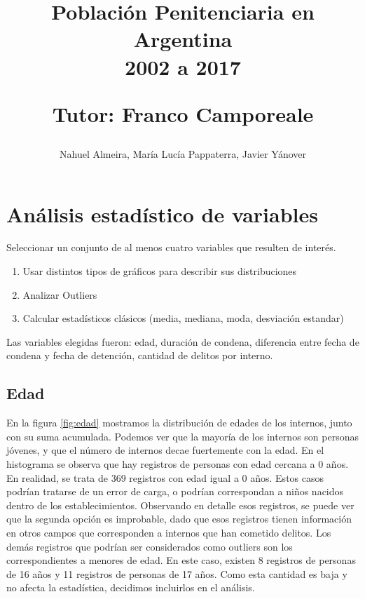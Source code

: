 \documentclass[10pt]{article}
\begin{document}
	
\title{Población Penitenciaria en Argentina\\ 2002 a 2017 \\
	\begin{small}
		Tutor: Franco Camporeale
	\end{small}}
\author{\small{Nahuel Almeira, María Lucía Pappaterra, Javier Y\'anover}}

\maketitle

\section{Análisis estadístico de variables}

Seleccionar un conjunto de al menos cuatro variables que resulten de interés.

\begin{enumerate}
	\item Usar distintos tipos de gráficos para describir sus distribuciones
	\item Analizar Outliers
	\item Calcular estadísticos clásicos (media, mediana, moda, desviación estandar)
\end{enumerate}

Las variables elegidas fueron: edad, duración de condena, diferencia entre fecha de condena y fecha de detención, cantidad de delitos por interno.

\subsection{Edad}

En la figura \ref{fig:edad} mostramos la distribuci\'on de edades de los internos, junto con su suma acumulada. Podemos ver que la mayor\'ia de los internos son personas j\'ovenes, y que el n\'umero de internos decae fuertemente con la edad. En el histograma se observa que hay registros de personas con edad cercana a 0 años. En realidad, se trata de 369 registros con edad igual a 0 años. Estos casos podr\'ian tratarse de un error de carga, o podr\'ian correspondan a ni\~nos nacidos dentro de los establecimientos. Observando en detalle esos registros, se puede ver que la segunda opci\'on es improbable, dado que esos registros tienen informaci\'on en otros campos que corresponden a internos que han cometido delitos.  Los dem\'as registros que podr\'ian ser considerados como outliers son los correspondientes a menores de edad. En este caso, existen 8 registros de personas de 16 a\~nos y 11 registros de personas de 17 a\~nos. Como esta cantidad es baja y no afecta la estad\'istica, decidimos incluirlos en el an\'alisis.
\end{document}
